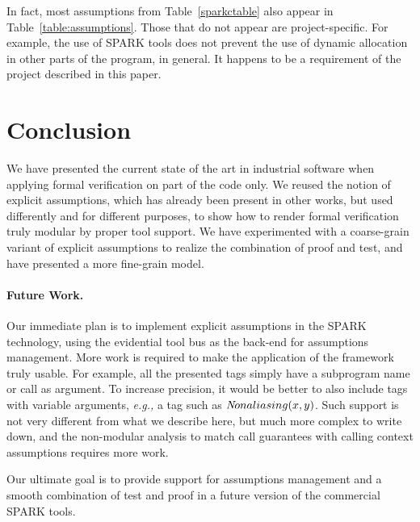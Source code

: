 \documentclass{llncs}
\newcommand{\spark}{SPARK\xspace}
\newcommand{\eg}{\textit{e.g.,}\xspace}
\begin{document}
In fact, most assumptions from Table~\ref{sparkctable} also appear in
Table~\ref{table:assumptions}. Those that do not appear are
project-specific. For example, the use of \spark tools does not prevent the use
of dynamic allocation in other parts of the program, in general. It happens to
be a requirement of the project described in this paper.

\section{Conclusion}

We have presented the current state of the art in industrial software when
applying formal verification on part of the code only. We reused the notion of
explicit assumptions, which has already been present in other works, but used
differently and for different purposes, to show how to render formal
verification truly modular by proper tool support.  We have experimented with
a coarse-grain variant of explicit assumptions to realize the combination of
proof and test, and have presented a more fine-grain model.

\paragraph{Future Work.} Our immediate plan is to implement explicit
assumptions in the \spark technology, using the evidential tool bus as the
back-end for assumptions management. More work is required to make the
application of the framework truly usable. For example, all the presented
tags simply have a subprogram name or call as argument. To increase precision,
it would be better to also include tags with variable arguments, \eg a tag
such as ${\textit Nonaliasing}(x,y)$. Such support is not very different from
what we describe here, but much more complex to write down, and the
non-modular analysis to match call guarantees with calling context assumptions
requires more work.

Our ultimate goal is to provide support for assumptions management and a
smooth combination of test and proof in a future version of the commercial
\spark tools.




\end{document}
